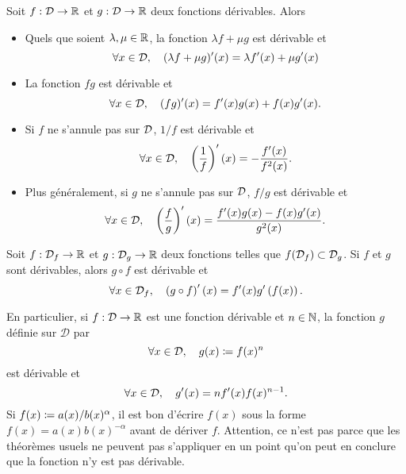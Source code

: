 \documentclass{magnoliaold}
\begin{document}
\begin{proposition}[utile=-3, nom={Théorèmes usuels}]
Soit $f:\mathcal{D}\to\mathbb{R}$ et $g:\mathcal{D}\to\mathbb{R}$ deux fonctions dérivables. Alors
\begin{itemize}
\item Quels que soient $\lambda, \mu\in\mathbb{R}$, la fonction
  $\lambda f+\mu g$ est dérivable et
  \[\forall x\in\mathcal{D},\quad (\lambda f+\mu g)'(x)=\lambda f'(x)+\mu g'(x)\]
\item La fonction $fg$ est dérivable et
  \[\forall x\in\mathcal{D},\quad (fg)'(x)=f'(x)g(x)+f(x)g'(x).\]
\item Si $f$ ne s'annule pas sur $\mathcal{D}$, $1/f$ est dérivable et
  \[\forall x\in\mathcal{D},\quad \left(\frac{1}{f}\right)'(x)=-\frac{f'(x)}{f^2(x)}.\]
\item Plus généralement, si $g$ ne s'annule pas sur $\mathcal{D}$, $f/g$ est dérivable
  et
  \[\forall x\in\mathcal{D},\quad \left(\frac{f}{g}\right)'(x)=\frac{f'(x)g(x)-f(x)g'(x)}{g^2(x)}.\]
\end{itemize}
\end{proposition}

\begin{proposition}[utile=-3, nom={Théorèmes usuels}]
Soit $f:\mathcal{D}_f\to\mathbb{R}$ et $g:\mathcal{D}_g\to\mathbb{R}$ deux fonctions telles que  $f(\mathcal{D}_f)\subset\mathcal{D}_g$. Si 
$f$ et $g$ sont dérivables, alors $g\circ f$ est dérivable et
\[\forall x\in\mathcal{D}_f,\quad \left(g\circ f\right)'(x)=f'(x)g'\left(f(x)\right).\]
\end{proposition}

\begin{remarqueUnique}
\remarque En particulier, si $f:\mathcal{D}\to\mathbb{R}$ est une fonction dérivable et $n\in\mathbb{N}$, la fonction $g$ définie sur $\mathcal{D}$ par
\[\forall x\in\mathcal{D},\quad g(x)\coloneqq f(x)^n\]
est dérivable et
\[\forall x\in\mathcal{D},\quad g'(x)=n f'(x) f(x)^{n-1}.\]
\remarque Si $f(x)\coloneqq a(x)/b(x)^\alpha$, il est bon d'écrire $f(x)$ sous la forme $f(x)=a(x)b(x)^{-\alpha}$ avant de dériver $f$.
\remarque Attention, ce n'est pas parce que les théorèmes usuels ne peuvent pas s'appliquer en un point qu'on peut en conclure que la fonction n'y est pas dérivable.
\end{remarqueUnique}
\end{document}
